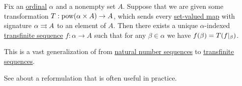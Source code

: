 \begin{theorem}\label{thm:bounded_transfinite_recursion}
  Fix an \hyperref[def:ordinal]{ordinal} \( \alpha \) and a nonempty set \( A \). Suppose that we are given some transformation \( T: \operatorname{pow}(\alpha \times A) \to A \), which sends every \hyperref[def:function]{set-valued map} with signature \( \alpha \rightrightarrows A \) to an element of \( A \). Then there exists a unique \( \alpha \)-indexed \hyperref[def:transfinite_sequence]{transfinite sequence} \( f: \alpha \to A \) such that for any \( \beta \in \alpha \) we have \( f(\beta) = T(f\vert_\beta) \).
\end{theorem}
\begin{comments}
  \item This is a vast generalization of  from \hyperref[def:sequence]{natural number sequences} to \hyperref[def:transfinite_sequence]{transfinite sequences}.

  \item See  about a reformulation that is often useful in practice.
\end{comments}

